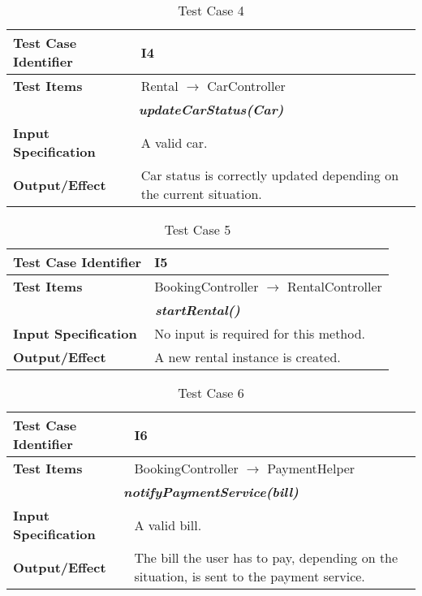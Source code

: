 \begin{table}[h]
	\begin{tabularx}{\textwidth}{l X}
		\hline
		\textbf{Test Case Identifier}	&	I4\\	\hline
		\textbf{Test Items}			&	Rental $\rightarrow$ CarController \\	\hline\hline
		\multicolumn{2}{c}{\textbf{\textit{updateCarStatus(Car)}}}	\\	\hline
			\textbf{Input Specification}	&	A valid car.\\	\hline
			\textbf{Output/Effect}	&	Car status is correctly updated depending on the current situation.\\	\hline
	\end{tabularx}
	\captionsetup{textformat=empty,labelformat=blank}
	\caption{Test Case 4}
	\label{table:template-table-4}
\end{table}

\begin{table}[h]
	\begin{tabularx}{\textwidth}{l X}
		\hline
		\textbf{Test Case Identifier}	&	I5\\	\hline
		\textbf{Test Items}			&	BookingController $\rightarrow$ RentalController \\	\hline\hline
		\multicolumn{2}{c}{\textbf{\textit{startRental()}}}	\\	\hline
			\textbf{Input Specification}	&	No input is required for this method.\\	\hline
			\textbf{Output/Effect}	&	A new rental instance is created.\\	\hline
	\end{tabularx}
	\captionsetup{textformat=empty,labelformat=blank}
	\caption{Test Case 5}
	\label{table:template-table-5}
\end{table}

\begin{table}[h]
	\begin{tabularx}{\textwidth}{l X}
		\hline
		\textbf{Test Case Identifier}	&	I6\\	\hline
		\textbf{Test Items}			&	BookingController $\rightarrow$ PaymentHelper \\	\hline\hline
		\multicolumn{2}{c}{\textbf{\textit{notifyPaymentService(bill)}}}	\\	\hline
			\textbf{Input Specification}	&	A valid bill.\\	\hline
			\textbf{Output/Effect}	&	The bill the user has to pay, depending on the situation, is sent to the payment service.\\	\hline
	\end{tabularx}
	\captionsetup{textformat=empty,labelformat=blank}
	\caption{Test Case 6}
	\label{table:template-table-6}
\end{table}

